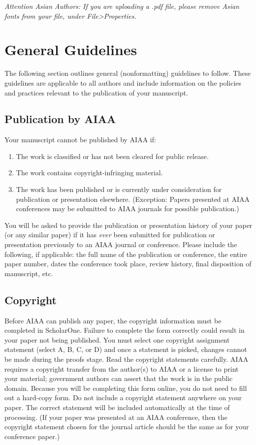 \documentclass[journal]{new-aiaa}
\begin{document}
\emph{Attention Asian Authors: If you are uploading a .pdf file, please remove Asian fonts from your file, under File>Properties.}

\section{General Guidelines}

The following section outlines general (nonformatting) guidelines to follow. These guidelines are applicable to all authors and include information on the policies and practices relevant to the publication of your manuscript.

\subsection{Publication by AIAA}
Your manuscript cannot be published by AIAA if:
\begin{enumerate}
\item The work is classified or has not been cleared for public release.
\item The work contains copyright-infringing material.
\item The work has been published or is currently under consideration for publication or presentation elsewhere. (Exception: Papers presented at AIAA conferences may be submitted to AIAA journals for possible publication.)
\end{enumerate}

You will be asked to provide the publication or presentation history of your paper (or any similar paper) if it has \emph{ever} been submitted for publication or presentation previously to an AIAA journal or conference. Please include the following, if applicable: the full name of the publication or conference, the entire paper number, dates the conference took place, review history, final disposition of manuscript, etc.


\subsection{Copyright}

Before AIAA can publish any paper, the copyright information must be completed in ScholarOne. Failure to complete the form correctly could result in your paper not being published. You must select one copyright assignment statement (select A, B, C, or D) and once a statement is picked, changes cannot be made during the proofs stage. Read the copyright statements carefully. AIAA requires a copyright transfer from the author(s) to AIAA or a license to print your material; government authors can assert that the work is in the public domain. Because you will be completing this form online, you do not need to fill out a hard-copy form. Do not include a copyright statement anywhere on your paper. The correct statement will be included automatically at the time of processing. (If your paper was presented at an AIAA conference, then the copyright statement chosen for the journal article should be the same as for your conference paper.)
\end{document}
